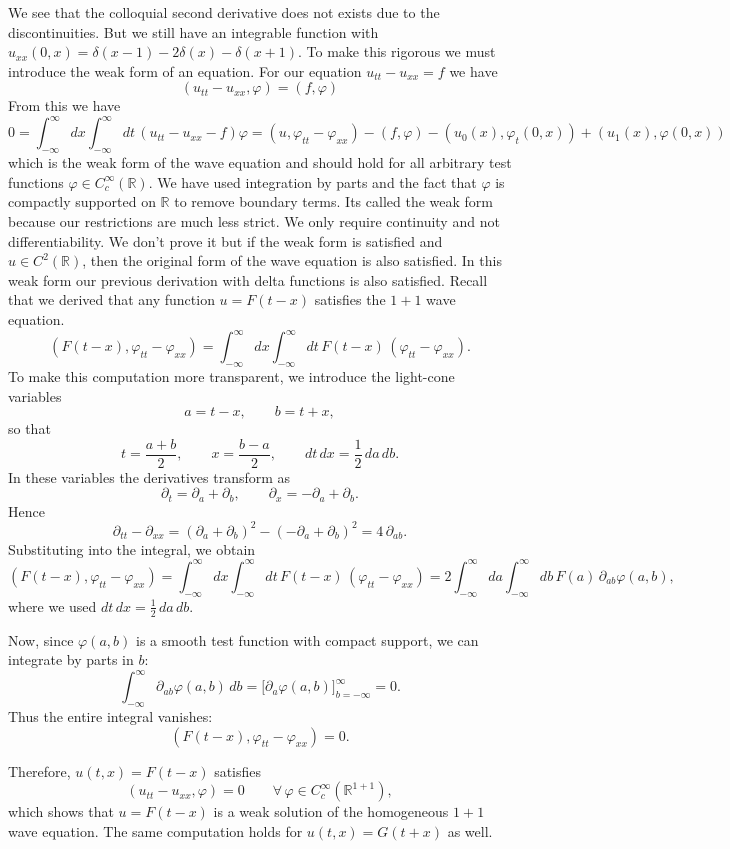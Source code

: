 \documentclass[11pt,a4paper]{article}
\begin{document}
We see that the colloquial  second derivative does not exists due to the discontinuities. But we still have an integrable function with $u_{xx}(0,x) = \delta(x-1)-2\delta(x)-\delta(x+1)$. To make this rigorous we must introduce the weak form of an equation. For our equation $u_{tt}-u_{xx} = f$ we have
$$
(u_{tt}-u_{xx},\varphi) = (f,\varphi)
$$
From this we have
$$
0 = \int_{-\infty}^{\infty}dx\int_{-\infty}^{\infty}dt\,(u_{tt}-u_{xx}-f)\varphi 
= (u,\varphi_{tt} - \varphi_{xx})-(f,\varphi) -(u_{0}(x),\varphi_{t}(0,x)) +(u_{1}(x),\varphi(0,x))
$$
which is the weak form of the wave equation and should hold for all arbitrary test functions $\varphi\in C_{c}^{\infty}(\mathbb{R})$. We have used integration by parts and the fact that $\varphi$ is compactly supported on $\mathbb{R}$ to remove boundary terms. Its called the weak form because our restrictions are much less strict. We only require continuity and not differentiability. We don't prove it but if the weak form is satisfied and $u\in C^{2}(\mathbb{R})$, then the original form of the wave equation is also satisfied. In this weak form our previous derivation with delta functions is also satisfied. Recall that we derived that any function $u = F(t - x)$ satisfies the $1+1$ wave equation.
\[
(F(t-x),\varphi_{tt}-\varphi_{xx}) = 
\int_{-\infty}^{\infty}\!dx \int_{-\infty}^{\infty}\!dt\,
F(t-x)\,(\varphi_{tt}-\varphi_{xx}).
\]
To make this computation more transparent, we introduce the light-cone variables
\[
a = t - x, \qquad b = t + x,
\]
so that
\[
t = \frac{a + b}{2}, \qquad x = \frac{b - a}{2}, \qquad
dt\,dx = \frac{1}{2}\, da\, db.
\]
In these variables the derivatives transform as
\[
\partial_t = \partial_a + \partial_b, \qquad
\partial_x = -\partial_a + \partial_b.
\]
Hence
\[
\partial_{tt} - \partial_{xx}
= (\partial_a + \partial_b)^2 - (-\partial_a + \partial_b)^2
= 4\,\partial_{ab}.
\]
Substituting into the integral, we obtain
\[
(F(t-x),\varphi_{tt}-\varphi_{xx})
= \int_{-\infty}^{\infty}\!dx \int_{-\infty}^{\infty}\!dt\,
F(t-x)\,(\varphi_{tt}-\varphi_{xx})
= 2\int_{-\infty}^{\infty}\!da \int_{-\infty}^{\infty}\!db\,
F(a)\, \partial_{ab}\varphi(a,b),
\]
where we used $dt\,dx = \frac{1}{2}\,da\,db$.

Now, since $\varphi(a,b)$ is a smooth test function with compact support,
we can integrate by parts in $b$:
\[
\int_{-\infty}^{\infty} \partial_{ab}\varphi(a,b)\, db
= \big[\partial_a\varphi(a,b)\big]_{b=-\infty}^{\infty} = 0.
\]
Thus the entire integral vanishes:
\[
(F(t-x),\varphi_{tt}-\varphi_{xx}) = 0.
\]

Therefore, $u(t,x) = F(t-x)$ satisfies
\[
(u_{tt}-u_{xx}, \varphi) = 0 \qquad \forall\, \varphi \in C_c^\infty(\mathbb{R}^{1+1}),
\]
which shows that $u = F(t-x)$ is a weak solution of the homogeneous $1+1$ wave equation.
The same computation holds for $u(t,x) = G(t+x)$ as well.
\newline
\end{document}
